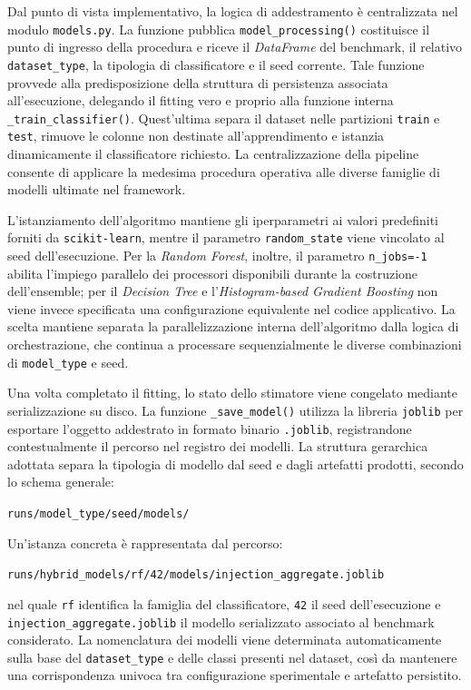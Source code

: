 Dal punto di vista implementativo, la logica di addestramento è centralizzata nel modulo \texttt{models.py}. 
La funzione pubblica \texttt{model\_processing()} costituisce il punto di ingresso della procedura e riceve il \textit{DataFrame} del benchmark, il relativo \texttt{dataset\_type}, la tipologia di classificatore e il seed corrente. 
Tale funzione provvede alla predisposizione della struttura di persistenza associata all'esecuzione, delegando il fitting vero e proprio alla funzione interna \texttt{\_train\_classifier()}. 
Quest'ultima separa il dataset nelle partizioni \texttt{train} e \texttt{test}, rimuove le colonne non destinate all'apprendimento e istanzia dinamicamente il classificatore richiesto. 
La centralizzazione della pipeline consente di applicare la medesima procedura operativa alle diverse famiglie di modelli ultimate nel framework.

L'istanziamento dell'algoritmo mantiene gli iperparametri ai valori predefiniti forniti da \newline \texttt{scikit-learn}, mentre il parametro \texttt{random\_state} viene vincolato al seed dell'esecuzione. 
Per la \textit{Random Forest}, inoltre, il parametro \texttt{n\_jobs=-1} abilita l'impiego parallelo dei processori disponibili durante la costruzione dell'ensemble; per il \textit{Decision Tree} e l'\textit{Histogram-based Gradient Boosting} non viene invece specificata una configurazione equivalente nel codice applicativo. 
La scelta mantiene separata la parallelizzazione interna dell'algoritmo dalla logica di orchestrazione, che continua a processare sequenzialmente le diverse combinazioni di \texttt{model\_type} e seed.

Una volta completato il fitting, lo stato dello stimatore viene congelato mediante serializzazione su disco. 
La funzione \texttt{\_save\_model()} utilizza la libreria \texttt{joblib} per esportare l'oggetto addestrato in formato binario \texttt{.joblib}, registrandone contestualmente il percorso nel registro dei modelli. 
La struttura gerarchica adottata separa la tipologia di modello dal seed e dagli artefatti prodotti, secondo lo schema generale:
\begin{center}
    \texttt{runs/model\_type/seed/models/}
\end{center}
Un'istanza concreta è rappresentata dal percorso:
\begin{center}
    \texttt{runs/hybrid\_models/rf/42/models/injection\_aggregate.joblib}
\end{center}
nel quale \texttt{rf} identifica la famiglia del classificatore, \texttt{42} il seed dell'esecuzione e \newline \texttt{injection\_aggregate.joblib} il modello serializzato associato al benchmark considerato. 
La nomenclatura dei modelli viene determinata automaticamente sulla base del \texttt{dataset\_type} e delle classi presenti nel dataset, così da mantenere una corrispondenza univoca tra configurazione sperimentale e artefatto persistito.

